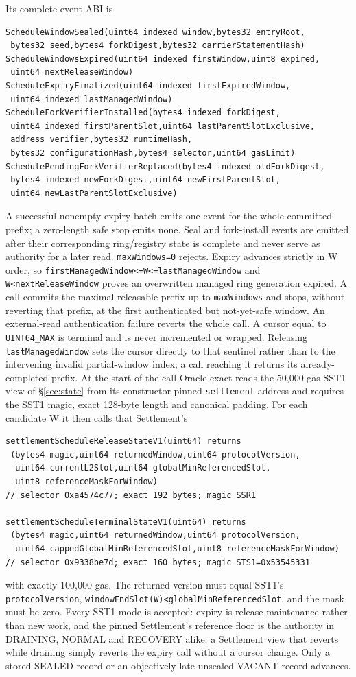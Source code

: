 \documentclass[a4paper,11pt]{article}
\newcommand{\code}[1]{\nolinkurl{#1}}
\begin{document}
Its complete event ABI is
\begin{verbatim}
ScheduleWindowSealed(uint64 indexed window,bytes32 entryRoot,
 bytes32 seed,bytes4 forkDigest,bytes32 carrierStatementHash)
ScheduleWindowsExpired(uint64 indexed firstWindow,uint8 expired,
 uint64 nextReleaseWindow)
ScheduleExpiryFinalized(uint64 indexed firstExpiredWindow,
 uint64 indexed lastManagedWindow)
ScheduleForkVerifierInstalled(bytes4 indexed forkDigest,
 uint64 indexed firstParentSlot,uint64 lastParentSlotExclusive,
 address verifier,bytes32 runtimeHash,
 bytes32 configurationHash,bytes4 selector,uint64 gasLimit)
SchedulePendingForkVerifierReplaced(bytes4 indexed oldForkDigest,
 bytes4 indexed newForkDigest,uint64 newFirstParentSlot,
 uint64 newLastParentSlotExclusive)
\end{verbatim}
A successful nonempty expiry batch emits one event for the whole committed
prefix; a zero-length safe stop emits none.  Seal and fork-install events are
emitted after their corresponding ring/registry state is complete and never
serve as authority for a later read.
\code{maxWindows=0} rejects.  Expiry advances strictly in W order, so
\code{firstManagedWindow<=W<=lastManagedWindow} and
\code{W<nextReleaseWindow} proves an overwritten managed ring generation
expired.  A
call commits the maximal releasable prefix up to \code{maxWindows} and stops,
without reverting that prefix, at the first authenticated but not-yet-safe
window.  An external-read authentication failure reverts the whole call.  A
cursor equal to \code{UINT64_MAX} is terminal and is never incremented or
wrapped.  Releasing \code{lastManagedWindow} sets the cursor directly
to that sentinel rather than to the intervening invalid partial-window index;
a call reaching it returns its already-completed prefix.  At the start
of the call Oracle exact-reads the 50,000-gas SST1 view of
\S\ref{sec:state} from its constructor-pinned \code{settlement} address and
requires the SST1 magic, exact 128-byte length and canonical padding.  For
each candidate W it then calls that Settlement's
\begin{verbatim}
settlementScheduleReleaseStateV1(uint64) returns
 (bytes4 magic,uint64 returnedWindow,uint64 protocolVersion,
  uint64 currentL2Slot,uint64 globalMinReferencedSlot,
  uint8 referenceMaskForWindow)
// selector 0xa4574c77; exact 192 bytes; magic SSR1

settlementScheduleTerminalStateV1(uint64) returns
 (bytes4 magic,uint64 returnedWindow,uint64 protocolVersion,
  uint64 cappedGlobalMinReferencedSlot,uint8 referenceMaskForWindow)
// selector 0x9338be7d; exact 160 bytes; magic STS1=0x53545331
\end{verbatim}
with exactly 100,000 gas.  The returned version must equal SST1's
\code{protocolVersion}, \code{windowEndSlot(W)<globalMinReferencedSlot}, and
the mask must be zero.  Every SST1 mode is accepted: expiry is release
maintenance rather than new work, and the pinned Settlement's reference floor
is the authority in DRAINING, NORMAL and RECOVERY alike; a Settlement view that
reverts while draining simply reverts the expiry call without a cursor change.
Only a stored SEALED record or an objectively late unsealed VACANT record
advances.
\end{document}
